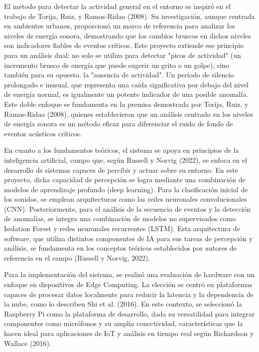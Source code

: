 El método para detectar la actividad general en el entorno se inspiró en el trabajo de Torija, Ruiz, y Ramos-Ridao (2008). Su investigación, aunque centrada en ambientes urbanos, proporcionó un marco de referencia para analizar los niveles de energía sonora, demostrando que los cambios bruscos en dichos niveles son indicadores fiables de eventos críticos. Este proyecto extiende ese principio para un análisis dual: no solo se utiliza para detectar "picos de actividad" (un incremento brusco de energía que puede sugerir un grito o un golpe), sino también para su opuesto, la "ausencia de actividad". Un período de silencio prolongado e inusual, que representa una caída significativa por debajo del nivel de energía normal, es igualmente un potente indicador de una posible anomalía. Este doble enfoque se fundamenta en la premisa demostrada por Torija, Ruiz, y Ramos-Ridao (2008), quienes establecieron que un análisis centrado en los niveles de energía sonora es un método eficaz para diferenciar el ruido de fondo de eventos acústicos críticos.

En cuanto a los fundamentos teóricos, el sistema se apoya en principios de la inteligencia artificial, campo que, según Russell y Norvig (2022), se enfoca en el desarrollo de sistemas capaces de percibir y actuar sobre su entorno. En este proyecto, dicha capacidad de percepción se logra mediante una combinación de modelos de aprendizaje profundo (deep learning). Para la clasificación inicial de los sonidos, se emplean arquitecturas como las redes neuronales convolucionales (CNN). Posteriormente, para el análisis de la secuencia de eventos y la detección de anomalías, se integra una combinación de modelos no supervisados como Isolation Forest y redes neuronales recurrentes (LSTM). Esta arquitectura de software, que utiliza distintos componentes de IA para sus tareas de percepción y análisis, se fundamenta en los conceptos teóricos establecidos por autores de referencia en el campo (Russell y Norvig, 2022).


Para la implementación del sistema, se realizó una evaluación de hardware con un enfoque en dispositivos de Edge Computing. La elección se centró en plataformas capaces de procesar datos localmente para reducir la latencia y la dependencia de la nube, como lo describen Shi et al. (2016). En este contexto, se seleccionó la Raspberry Pi como la plataforma de desarrollo, dada su versatilidad para integrar componentes como micrófonos y su amplia conectividad, características que la hacen ideal para aplicaciones de IoT y análisis en tiempo real según Richardson y Wallace (2016).

